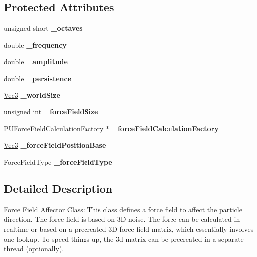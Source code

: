 \subsection*{Protected Attributes}
\begin{DoxyCompactItemize}
\item 
\mbox{\label{classPUForceField_a2cee0d214c509061d0362c74099809e1}} 
unsigned short {\bfseries \+\_\+octaves}
\item 
\mbox{\label{classPUForceField_afa5c3ad1a53adfc2f253673c9f989bb4}} 
double {\bfseries \+\_\+frequency}
\item 
\mbox{\label{classPUForceField_a9abaee30d4d516cddc0e434c2a8cfc97}} 
double {\bfseries \+\_\+amplitude}
\item 
\mbox{\label{classPUForceField_ab1b798b9e2602a33a5eee2955bf8e145}} 
double {\bfseries \+\_\+persistence}
\item 
\mbox{\label{classPUForceField_a2c26cd1b2f82228c15119b7d783163e1}} 
\hyperlink{classVec3}{Vec3} {\bfseries \+\_\+world\+Size}
\item 
\mbox{\label{classPUForceField_a671c6968427af11841c9c5dcd1885118}} 
unsigned int {\bfseries \+\_\+force\+Field\+Size}
\item 
\mbox{\label{classPUForceField_a2b86ba5678aba51fe64a9f77e371c773}} 
\hyperlink{classPUForceFieldCalculationFactory}{P\+U\+Force\+Field\+Calculation\+Factory} $\ast$ {\bfseries \+\_\+force\+Field\+Calculation\+Factory}
\item 
\mbox{\label{classPUForceField_ae81b133139e0f5ab197d29cd43f107df}} 
\hyperlink{classVec3}{Vec3} {\bfseries \+\_\+force\+Field\+Position\+Base}
\item 
\mbox{\label{classPUForceField_a64a611ef94d1acbae7af5c59d52fdf87}} 
Force\+Field\+Type {\bfseries \+\_\+force\+Field\+Type}
\end{DoxyCompactItemize}


\subsection{Detailed Description}
Force Field Affector Class\+: This class defines a force field to affect the particle direction. The force field is based on 3D noise. The force can be calculated in realtime or based on a precreated 3D force field matrix, which essentially involves one lookup. To speed things up, the 3d matrix can be precreated in a separate thread (optionally). 

